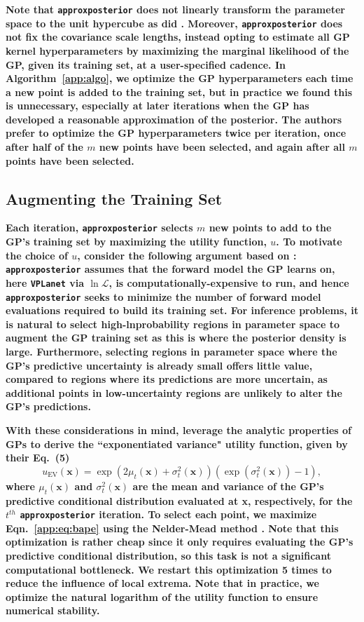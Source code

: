 \documentclass[twocolumn]{aastex62}
\newcommand{\xxx}[1]{{\textbf{#1}}}
\newcommand{\vplanet}[0]{\texttt{VPLanet}\xspace}
\newcommand{\approxposterior}[0]{\texttt{approxposterior}\xspace}
\begin{document}
\xxx{Note that \approxposterior does not linearly transform the parameter space to the unit hypercube as did \citet{Kandasamy2017}. Moreover, \approxposterior does not fix the covariance scale lengths, instead opting to estimate all GP kernel hyperparameters by maximizing the marginal likelihood of the GP, given its training set, at a user-specified cadence. In Algorithm~\ref{app:algo}, we optimize the GP hyperparameters each time a new point is added to the training set, but in practice we found this is unnecessary, especially at later iterations when the GP has developed a reasonable approximation of the posterior. The authors prefer to optimize the GP hyperparameters twice per iteration, once after half of the $m$ new points have been selected, and again after all $m$ points have been selected.}

\subsection{Augmenting the Training Set} \label{app:augment}

\xxx{Each iteration, \approxposterior selects $m$ new points to add to the GP's training set by maximizing the utility function, $u$. To motivate the choice of $u$, consider the following argument based on \citet{Kandasamy2017}: \approxposterior assumes that the forward model the GP learns on, here \vplanet via $\ln \mathcal{L}$, is computationally-expensive to run, and hence \approxposterior seeks to minimize the number of forward model evaluations required to build its training set. For inference problems, it is natural to select high-lnprobability regions in parameter space to augment the GP training set as this is where the posterior density is large. Furthermore, selecting regions in parameter space where the GP's predictive uncertainty is already small offers little value, compared to regions where its predictions are more uncertain, as additional points in low-uncertainty regions are unlikely to alter the GP's predictions.} 

\xxx{With these considerations in mind, \citet{Kandasamy2017} leverage the analytic properties of GPs to derive the ``exponentiated variance" utility function, given by their Eq.~(5)}
\begin{equation} \label{app:eq:bape}
    u_{\textrm{EV}}(\textbf{x}) = \exp(2 \mu_t(\textbf{x}) + \sigma_t^2(\textbf{x}))(\exp(\sigma_t^2(\textbf{x})) - 1),
\end{equation}
\xxx{where $\mu_t(\textbf{x})$ and $\sigma_t^2(\textbf{x})$ are the mean and variance of the GP's predictive conditional distribution evaluated at \textbf{x}, respectively, for the $t^{th}$ \approxposterior iteration. To select each point, we maximize Eqn.~\ref{app:eq:bape} using the Nelder-Mead method \citep{Nelder1965}. Note that this optimization is rather cheap since it only requires evaluating the GP's predictive conditional distribution, so this task is not a significant computational bottleneck. We restart this optimization 5 times to reduce the influence of local extrema. Note that in practice, we optimize the natural logarithm of the utility function to ensure numerical stability.}
\end{document}
